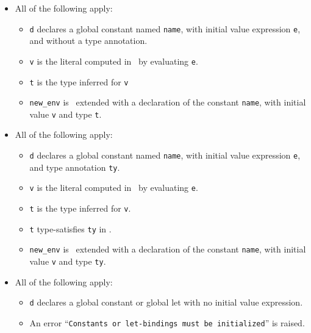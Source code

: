 \documentclass{book}
\newcommand\name[0]{\texttt{name}}
\begin{document}
\begin{itemize}
  \item All of the following apply:
  \begin{itemize}
    \item \texttt{d} declares a global constant named \name, with initial value expression \texttt{e}, and without a type annotation.
    \item \texttt{v} is the literal computed in \tenv\ by evaluating \texttt{e}.
    \item \texttt{t} is the type inferred for \texttt{v}
    \item \texttt{new\_env} is \tenv\ extended with a declaration of the constant \name, with initial value \texttt{v} and type \texttt{t}.
  \end{itemize}

  \item All of the following apply:
  \begin{itemize}
    \item \texttt{d} declares a global constant named \name, with initial value expression \texttt{e}, and type annotation \texttt{ty}.
    \item \texttt{v} is the literal computed in \tenv\ by evaluating \texttt{e}.
    \item \texttt{t} is the type inferred for \texttt{v}.
    \item \texttt{t} type-satisfies \texttt{ty} in \tenv.
    \item \texttt{new\_env} is \tenv\ extended with a declaration of the constant \name, with initial value \texttt{v} and type \texttt{ty}.
  \end{itemize}

  \item All of the following apply:
  \begin{itemize}
    \item \texttt{d} declares a global constant or global let with no initial value expression.
    \item An error ``\texttt{Constants or let-bindings must be initialized}'' is raised.
  \end{itemize}


\end{itemize}
\end{document}
